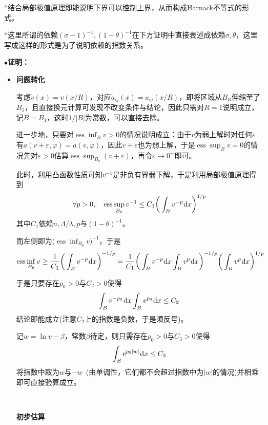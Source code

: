 \documentclass[a4paper,UTF8,fontset=windows,AutoFakeBold]{ctexart}
\newcommand*{\er}{\mathrm{e}}
\newcommand*{\dr}{\hspace{0.07em}\mathrm{d}}
\DeclareMathOperator*{\ess}{ess}
\newcommand{\proo}[1]{{\kaishu $\bullet$\textbf{证明：}
\begin{itemize}
    \item[] #1
\end{itemize}
}}
\begin{document}
*结合局部极值原理即能说明下界可以控制上界，从而构成Harnack不等式的形式。

*这里所谓的依赖$(\sigma-1)^{-1},(1-\theta)^{-1}$在下方证明中直接表述成依赖$\sigma,\theta$，这里写成这样的形式是为了说明依赖的指数关系。

\proo{
    \textbf{问题转化}

    考虑$\tilde{v}(x)=v(x/R)$，对应$\tilde{a}_{ij}(x)=a_{ij}(x/R)$，即将区域从$B_R$伸缩至了$B_1$，且直接换元计算可发现不改变条件与结论，因此只需对$R=1$说明成立，记$B=B_1$，这时$1/|B|$为常数，可以直接去除。

    进一步地，只要对$\ess\inf_Bv>0$的情况说明成立：由于$v$为弱上解时对任何$\varepsilon$有$a(v+\varepsilon,\varphi)=a(v,\varphi)$，因此$v+\varepsilon$也为弱上解，于是$\ess\sup_Bv=0$的情况先对$\varepsilon>0$估算$\ess\sup_{B_\theta}(v+\varepsilon)$，再令$\varepsilon\to0^+$即可。

    此时，利用凸函数性质可知$v^{-1}$是非负有界弱下解，于是利用局部极值原理得到
    $$\forall p>0,\quad\ess\sup_{B_\theta}v^{-1}\le C_1\bigg(\int_Bv^{-p}\dr x\bigg)^{1/p}$$
    其中$C_1$依赖$n,\Lambda/\lambda,p$与$(1-\theta)^{-1}$。

    而左侧即为$\big(\ess\inf_{B_\theta}v\big)^{-1}$，于是
    $$\ess\inf_{B_\theta}v\ge\frac{1}{C_1}\bigg(\int_Bv^{-p}\dr x\bigg)^{-1/p}=\frac{1}{C_1}\bigg(\int_Bv^{-p}\dr x\int_Bv^p\dr x\bigg)^{-1/p}\bigg(\int_Bv^p\dr x\bigg)^{1/p}$$

    于是只要存在$p_0>0$与$C_2>0$使得
    $$\int_Bv^{-{p_0}}\dr x\int_Bv^{p_0}\dr x\le C_2$$
    结论即能成立(注意$C_2$上的指数是负数，于是须反号)。

    记$w=\ln v-\beta$，常数$\beta$待定，则只需存在$p_0>0$与$C_3>0$使得
    $$\int_B\er^{p_0|w|}\dr x\le C_3$$
    将指数中取为$w$与$-w$\ (由单调性，它们都不会超过指数中为$|w|$的情况)并相乘即可直接验算成立。

    \

    \textbf{初步估算}

}
\end{document}
